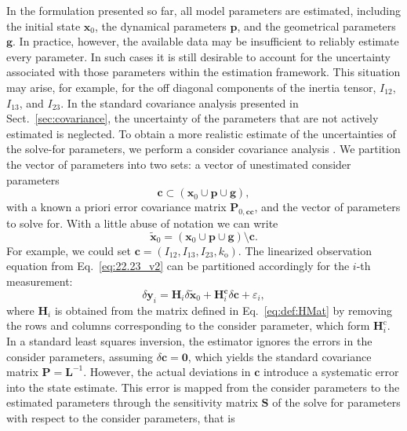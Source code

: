 \documentclass[pdflatex,sn-mathphys-num]{sn-jnl}%
\theoremstyle{thmstyleone}%
\theoremstyle{thmstyletwo}%
\theoremstyle{thmstylethree}%
\renewcommand{\vec}[1]{\boldsymbol{#1}}
\begin{document}
In the formulation presented so far, all model parameters are estimated, including the initial state $\vec{x}_0$, the dynamical parameters $\vec{p}$, and the geometrical parameters $\vec{g}$. In practice, however, the available data may be insufficient to reliably estimate every parameter.
In such cases it is still desirable to account for the uncertainty associated with those parameters within the estimation framework. This situation may arise, for example, for the off diagonal components of the inertia tensor, $I_{12}$, $I_{13}$, and $I_{23}$.
%
In the standard covariance analysis presented in Sect.~\ref{sec:covariance}, the uncertainty of the parameters that are not actively estimated is neglected. To obtain a more realistic estimate of the uncertainties of the solve-for parameters, we perform a consider covariance analysis \citep[see, e.g.,][]{2004sod..book.....T}.
%
We partition the vector of parameters into two sets:  a vector of unestimated consider parameters 
\begin{equation}
	\label{eq:def}
	\vec{c} \subset \left( \vec{x}_0 \cup \vec{p} \cup \vec{g} \right),
\end{equation}
with a known a priori error covariance matrix $\vec{P}_{0,\vec{c}\vec{c}}$,
and the vector of parameters to solve for. With a little abuse of notation we can write 
%
\begin{equation}\label{eq:solve_for}
	\tilde{\vec{x}}_{0} = 
 	\left( \vec{x}_0 \cup \vec{p} \cup \vec{g} \right) \setminus \vec{c}.
\end{equation} 
%
For example, we could set ${\vec{c} = (I_{12}, I_{13}, I_{23}, k_{\mathrm{o}})}$.
%
The linearized observation equation from Eq.~\eqref{eq:22.23_v2} can be partitioned accordingly for the $i$-th measurement:
\begin{equation}
    \delta\vec{y}_i = \vec{H}_{i} \delta \tilde{\vec{x}}_{0} + \vec{H}_{i}^{\vec{c}} \delta\vec{c} + \varepsilon_i,
\end{equation}
where $\vec{H}_{i}$ is obtained from the matrix defined in Eq.~\eqref{eq:def:HMat} by removing the rows and columns corresponding to the consider parameter, which form $\vec{H}_{i}^\mathrm{c}$.
%
In a standard least squares inversion, the estimator ignores the errors in the consider parameters, assuming ${\delta\vec{c} = \vec{0}}$, which yields the standard covariance matrix ${\vec{P} = \vec{L}^{-1}}$. However, the actual deviations in $\vec{c}$ introduce a systematic error into the state estimate. This error is mapped from the consider parameters to the estimated parameters through the sensitivity matrix $\vec{S}$ of the solve for parameters with respect to the consider parameters, that is
\end{document}
